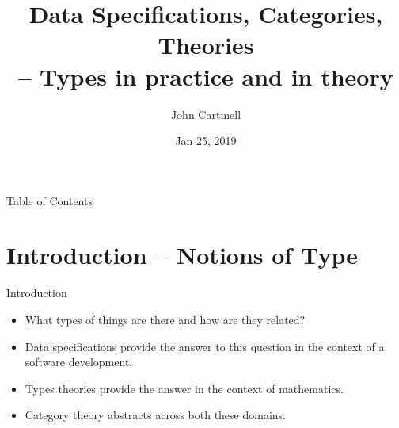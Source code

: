 \documentclass{beamer}
\title[Types in practice and in theory]{Data Specifications, Categories, Theories\\ -- Types in practice and in theory}
\author{John Cartmell}
\institute{Otium}
\date{Jan 25, 2019}
\begin{document}
\begin{frame}
\titlepage
\end{frame}

\begin{frame}{Table of Contents}
\tableofcontents
\end{frame}

\section{Introduction -- Notions of Type}
\begin{frame}{Introduction}
\begin{itemize}
\item
What types of things are there and how are they related? 
\pause \item Data specifications provide the answer to this question in the context of a software development. 
\pause \item Types theories provide the answer in the context of mathematics. 
\pause \item Category theory abstracts across both these domains.
\end{itemize}

\end{frame}
\end{document}
